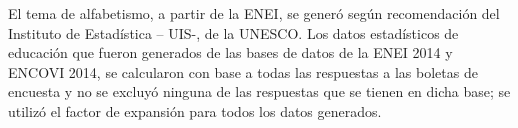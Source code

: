 \begin{itemize}
 El  tema de alfabetismo, a partir de la ENEI, se generó según recomendación del Instituto de Estadística – UIS-, de la UNESCO. Los datos estadísticos de educación que fueron generados de las bases de datos de la ENEI 2014 y ENCOVI 2014, se calcularon con base a todas las respuestas a las boletas de encuesta y no se excluyó ninguna de las respuestas que se tienen en dicha base; se utilizó el factor de expansión para todos los datos generados.




\end{itemize}


